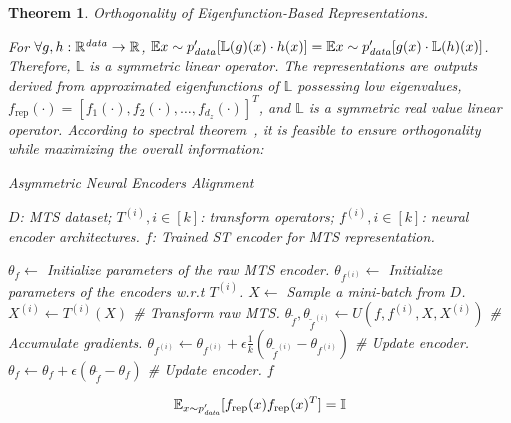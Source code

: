 \documentclass{article}
\newtheorem{theorem}{\textbf{Theorem}} %
\begin{document}
\begin{theorem}\label{the:orth}
Orthogonality of Eigenfunction-Based Representations.

For $ \forall g, h: \mathbb{R^{\text{\textit{data}}}} \to \mathbb{R}$, $\mathbb{E}{x \sim p_{\text{\textit{data}}}'}[\mathbb{L}(g)(x) \cdot h(x)] =\mathbb{E}{x \sim p_{\text{\textit{data}}}'}[g(x) \cdot \mathbb{L}(h)(x)]$. Therefore, $\mathbb{L}$ is a symmetric linear operator. The representations are outputs derived from approximated eigenfunctions of $\mathbb{L}$ possessing low eigenvalues, $f_{\text{rep}}(\cdot) = [f_1(\cdot), f_2(\cdot), \dots, f_{d_z}(\cdot)]^T$, and $\mathbb{L}$ is a symmetric real value linear operator. According to spectral theorem~\cite{trevisan2017lecture}, it is feasible to ensure orthogonality while maximizing the overall information:


\begin{algorithm}[t]
   \caption{Asymmetric Neural Encoders Alignment}
   \label{algo}
   \begin{algorithmic}
    $D$: MTS dataset; $T^{(i)}, i \in [k]$: transform operators; $f^{(i)}, i \in [k]$: neural encoder architectures.
    $f$: Trained ST encoder for MTS representation.
   
   \STATE $\theta_{f} \gets$ Initialize parameters of the raw MTS encoder.
       \STATE $\theta_{f^{(i)}} \gets$ Initialize parameters of the encoders w.r.t $T^{(i)}$.
   \ENDFOR
       \STATE $X \gets$ Sample a mini-batch from $D$.
           \STATE $X^{(i)} \gets T^{(i)}(X)$ \# Transform raw MTS.
           \STATE $\theta_{\tilde f}, \theta_{\tilde f^{(i)}} \gets U(f, f^{(i)}, X, X^{(i)})$ \# Accumulate gradients.
           \STATE $\theta_{f^{(i)}} \gets \theta_{f^{(i)}} + \epsilon \frac{1}{k} (\theta_{\tilde f^{(i)}} - \theta_{f^{(i)}})$ \# Update encoder.
       \ENDFOR
       \STATE $\theta_{f} \gets \theta_{f} + \epsilon (\theta_{\tilde f} - \theta_{f})$ \# Update encoder.
   \ENDWHILE
    $f$
   \end{algorithmic}
\end{algorithm}

\begin{equation}
\mathbb{E}_{x \sim p_{\text{\textit{data}}}'}[f_{\text{rep}}(x)f_{\text{rep}}(x)^T] = \mathbb{I}
\end{equation}
\end{theorem}
\end{document}
